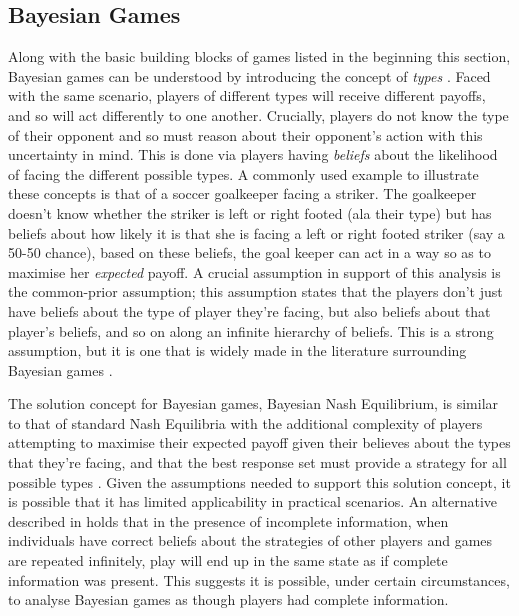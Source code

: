 \documentclass[11pt]{article}
\newcommand*{\np}{\par\noindent\newline}
\begin{document}
\subsection{Bayesian Games}
Along with the basic building blocks of games listed in the beginning this section, Bayesian games can be understood
by introducing the concept of \textit{types} \citep[~p. 167]{shoham_multiagent_2008}. Faced with the same scenario,
players of different types will receive different payoffs, and so will act differently to one another. Crucially,
players do not know the type of their opponent and so must reason about their opponent's action with this uncertainty in
mind. This is done via players having \textit{beliefs} about the likelihood of facing the different possible types. A
commonly used example to illustrate these concepts is that of a soccer goalkeeper facing a striker. The goalkeeper
doesn't know whether the striker is left or right footed (ala their type) but has beliefs about how likely it is that
she is facing a left or right footed striker (say a 50-50 chance), based on these beliefs, the goal keeper can act in a way so as to maximise her \textit{expected} payoff. 
A crucial assumption in support of this analysis is the common-prior assumption; this assumption states that the players
don't just have beliefs about the type of player they're facing, but also beliefs about that player's beliefs, and so on
along an infinite hierarchy of beliefs. This is a strong assumption, but it is one that is widely made in the literature
surrounding Bayesian games \citep[~p. 164]{shoham_multiagent_2008}. 

\np The solution concept for Bayesian games, Bayesian Nash Equilibrium, is similar to that of standard Nash Equilibria with the additional complexity of players attempting to maximise their expected payoff given their believes about the types that they're facing, and that the best response set must provide a strategy for all possible types \citep{shoham_multiagent_2008}. Given the assumptions needed to support this solution concept, it is possible that it has limited applicability in practical scenarios. An alternative described in \citet{kalai_rational_1993} holds that in the presence of incomplete information, when individuals have correct beliefs about the strategies of other players and games are repeated infinitely, play will end up in the same state as if complete information was present. This suggests it is possible, under certain circumstances, to analyse Bayesian games as though players had complete information.
\end{document}
